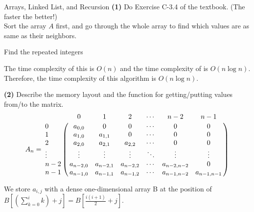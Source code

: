 \begin{homeworkProblem}{Arrays, Linked List, and Recursion}
    \textbf{(1)} Do Exercise C-3.4 of the textbook. (The faster the better!)
    \\

    Sort the array $A$ first, and go through the whole array to find which values are as 
    same as their neighbors.
    \\

    \begin{algorithm}[]
        \begin{algorithmic}[1]
                \EndIf
            \EndWhile
        \end{algorithmic}
        \caption{Find the repeated integers}
    \end{algorithm}

    The time complexity of this  is $O(n)$ and the time complexity of
     is $O(n \log n)$. Therefore, the time complexity of this algorithm
    is $O(n \log n)$.
    \\

    \pagebreak

    \textbf{(2)} Describe the memory layout and the function for getting/putting values
    from/to the matrix.
    \\

    \[
    A_n = \bordermatrix{~      & 0       & 1       & 2       & \cdots & n - 2   & n - 1    \cr
                        0      & a_{0,0} & 0       & 0       & \cdots & 0       & 0        \cr
                        1      & a_{1,0} & a_{1,1} & 0       & \cdots & 0       & 0        \cr
                        2      & a_{2,0} & a_{2,1} & a_{2,2} & \cdots & 0       & 0        \cr
                        \vdots & \vdots  & \vdots  & \vdots  & \ddots & \vdots  & \vdots   \cr
                        n - 2  & a_{n-2,0} & a_{n-2,1} & a_{n-2,2} & \cdots & a_{n-2,n-2} & 0        \cr
                        n - 1  & a_{n-1,0} & a_{n-1,1} & a_{n-1,2} & \cdots & a_{n-1,n-2} & a_{n-1,n-1}  \cr}
    \]



    We store $a_{i,j}$ with a dense one-dimensional array B at the position of 
    $B[(\sum\limits_{k=0}^i k) + j] = B[\frac{i(i+1)}{2} + j]$. 


\end{homeworkProblem}

